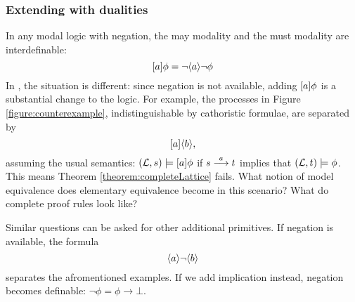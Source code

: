 \subsubsection{Extending \cathoristic{} with dualities}
In any modal logic with negation, the may modality and the must modality are interdefinable:
\[
[ a ] \phi = \neg
\langle a \rangle \neg \phi
\]
In \cathoristic{}, the situation is different: since
negation is not available, adding $[ a ] \phi$ is a substantial
change to the logic.
For example, the processes in Figure
\ref{figure:counterexample}, indistinguishable by cathoristic formulae, are
separated by
  \[
     [ a ] \langle b \rangle,
  \]
  assuming the usual semantics: $(\mathcal{L}, s) \models [ a ] \phi$ if
  $s \stackrel{a}{\longrightarrow} t$ implies that $(\mathcal{L}, t) \models \phi$. This means
  Theorem \ref{theorem:completeLattice} fails. What notion of model
  equivalence does elementary equivalence become in this scenario?
  What do complete proof rules look like?

  Similar questions can be asked for other additional primitives. If negation is 
  available, the formula
  \[
     \langle a \rangle \neg \langle b \rangle
  \]
  separates the afromentioned examples. If we add implication instead,
  negation becomes definable: $\neg \phi = \phi \rightarrow \bot$.



